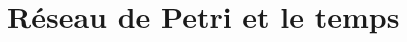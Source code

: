 \documentclass[compress]{beamer}
\begin{document}


\section{Réseau de Petri et le temps}
\begin{frame}
\tableofcontents[hideothersubsections]
\end{frame}
\end{document}
